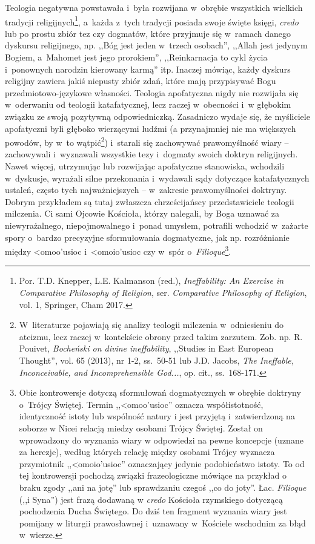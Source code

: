 Teologia negatywna powstawała i~była rozwijana w~obrębie wszystkich wielkich tradycji religijnych\footnote{Por. T.D. Knepper, L.E. Kalmanson (red.), \textit{Ineffability: An Exercise in Comparative Philosophy of Religion}, ser. \textit{Comparative Philosophy of Religion}, vol. 1, Springer, Cham 2017.}, a~każda z~tych tradycji posiada swoje święte księgi, \textit{credo} lub po prostu zbiór tez czy dogmatów, które przyjmuje się w~ramach danego dyskursu religijnego, np. ,,Bóg jest jeden w~trzech osobach'', ,,Allah jest jedynym Bogiem, a~Mahomet jest jego prorokiem'', ,,Reinkarnacja to cykl życia i~ponownych narodzin kierowany karmą'' itp. Inaczej mówiąc, każdy dyskurs religijny zawiera jakiś niepusty zbiór zdań, które mają przypisywać Bogu
przedmiotowo-językowe
własności. Teologia apofatyczna nigdy nie rozwijała się w~oderwaniu od teologii katafatycznej, lecz raczej w~obecności i~w głębokim związku ze swoją pozytywną odpowiedniczką. Zasadniczo wydaje się, że myśliciele apofatyczni byli głęboko wierzącymi ludźmi (a przynajmniej nie ma większych powodów, by w~to wątpić\footnote{W~literaturze pojawiają się analizy teologii milczenia w~odniesieniu do ateizmu, lecz raczej w~kontekście obrony przed takim zarzutem. Zob. np. R. Pouivet, \textit{Bocheński on divine ineffability}, ,,Studies in East European Thought'', vol. 65 (2013), nr 1-2, ss.~50-51 lub J.D. Jacobs, \textit{The Ineffable, Inconceivable, and Incomprehensible God...}, op. cit., ss.~168-171.}) i~starali się zachowywać prawomyślność wiary -- zachowywali i~wyznawali wszystkie tezy i~dogmaty swoich doktryn religijnych. Nawet więcej, utrzymując lub rozwijając apofatyczne stanowiska, wchodzili w~dyskusje, wyrażali silne przekonania i~wydawali sądy dotyczące katafatycznych ustaleń, często tych najważniejszych -- w~zakresie prawomyślności doktryny. Dobrym przykładem są tutaj zwłaszcza chrześcijańscy przedstawiciele teologii milczenia. Ci sami Ojcowie Kościoła, którzy nalegali, by Boga uznawać za niewyrażalnego, niepojmowalnego i~ponad umysłem, potrafili wchodzić w~zażarte spory o~bardzo precyzyjne sformułowania dogmatyczne, jak np. rozróżnianie między
\textgreek{<omoo'usioc}
i~\textgreek{<omoio'usioc}
czy w~spór o~\textit{Filioque}\footnote{Obie kontrowersje dotyczą sformułowań dogmatycznych w obrębie doktryny o~Trójcy Świętej. Termin ,,\textgreek{<omoo'usioc}'' oznacza współistotność, identyczność istoty lub wspólność natury i jest przyjętą i~zatwierdzoną na soborze w Nicei relacją miedzy osobami Trójcy Świętej. Został on wprowadzony do wyznania wiary w odpowiedzi na pewne koncepcje (uznane za herezje), według których relację między osobami Trójcy wyznacza przymiotnik ,,\textgreek{<omoio'usioc}'' oznaczający jedynie podobieństwo istoty. To od tej kontrowersji pochodzą związki frazeologiczne mówiące na przykład o braku zgody ,,ani na jotę'' lub sprawdzaniu czegoś ,,co do joty''. Łac. \textit{Filioque} (,,i Syna'') jest frazą dodawaną w \textit{credo} Kościoła rzymskiego dotyczącą pochodzenia Ducha Świętego. Do dziś ten fragment wyznania wiary jest pomijany w liturgii prawosławnej i~uznawany w~Kościele wschodnim za błąd w~wierze.}.

